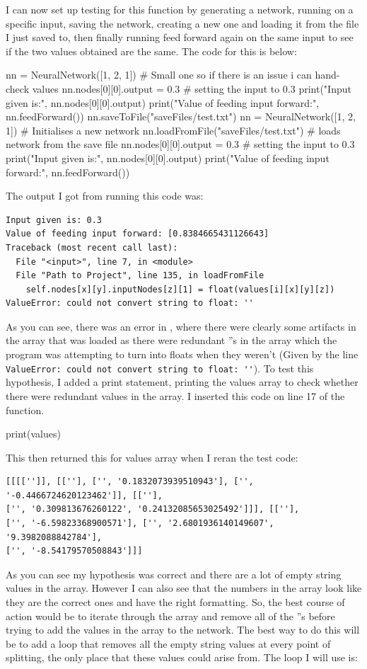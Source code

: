 \documentclass{report}
\begin{document}
I can now set up testing for this function by generating a network, running  on a specific input, saving the network, creating a new one and loading it from the file I just saved to, then finally running feed forward again on the same input to see if the two values obtained are the same. The code for this is below:
\begin{python}
nn = NeuralNetwork([1, 2, 1]) # Small one so if there is an issue i can hand-check values
nn.nodes[0][0].output = 0.3 # setting the input to 0.3
print("Input given is:", nn.nodes[0][0].output)
print("Value of feeding input forward:", nn.feedForward())
nn.saveToFile("saveFiles/test.txt")
nn = NeuralNetwork([1, 2, 1]) # Initialises a new network
nn.loadFromFile("saveFiles/test.txt") # loads network from the save file
nn.nodes[0][0].output = 0.3 # setting the input to 0.3
print("Input given is:", nn.nodes[0][0].output)
print("Value of feeding input forward:", nn.feedForward())
\end{python}
The output I got from running this code was:
\begin{verbatim}
Input given is: 0.3
Value of feeding input forward: [0.8384665431126643]
Traceback (most recent call last):
  File "<input>", line 7, in <module>
  File "Path to Project", line 135, in loadFromFile
    self.nodes[x][y].inputNodes[z][1] = float(values[i][x][y][z])
ValueError: could not convert string to float: ''
\end{verbatim}
As you can see, there was an error in , where there were clearly some artifacts in the array that was loaded as there were redundant ''s in the array which the program was attempting to turn into floats when they weren't (Given by the line \verb"ValueError: could not convert string to float: ''"). To test this hypothesis, I added a print statement, printing the values array to check whether there were redundant values in the array. I inserted this code on line 17 of the function.
\begin{python}
print(values)
\end{python}
This then returned this for values array when I reran the test code:
\begin{verbatim}
[[[['']], [[''], ['', '0.1832073939510943'], ['', '-0.4466724620123462']], [[''],
['', '0.309813676260122', '0.24132085653025492']]], [[''],
['', '-6.59823368900571'], ['', '2.6801936140149607', '9.3982088842784'],
['', '-8.54179570508843']]]
\end{verbatim}
As you can see my hypothesis was correct and there are a lot of empty string values in the array. However I can also see that the numbers in the array look like they are the correct ones and have the right formatting. So, the best course of action would be to iterate through the array and remove all of the ''s before trying to add the values in the array to the network. The best way to do this will be to add a loop that removes all the empty string values at every point of splitting, the only place that these values could arise from. The loop I will use is:
\end{document}
